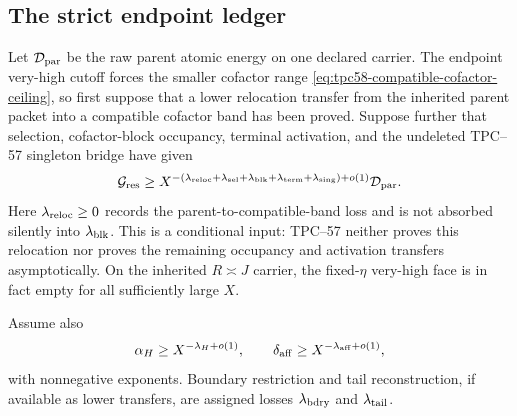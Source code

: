 \subsection{The strict endpoint ledger}

Let \(\mathcal D_{\rm par}\) be the raw parent atomic energy on one declared
carrier.  The endpoint very-high cutoff forces the smaller cofactor range
\eqref{eq:tpc58-compatible-cofactor-ceiling}, so first suppose that a lower
relocation transfer from the inherited parent packet into a compatible
cofactor band has been proved.  Suppose further that selection,
cofactor-block occupancy, terminal activation, and the undeleted TPC--57
singleton bridge have given
\begin{equation}
 \mathcal G_{\rm res}
 \ge
 X^{-(\lambda_{\rm reloc}+\lambda_{\rm sel}+\lambda_{\rm blk}
      +\lambda_{\rm term}+\lambda_{\rm sing})+o(1)}
 \mathcal D_{\rm par}.
 \label{eq:tpc58-upstream-residual-lower}
\end{equation}
Here \(\lambda_{\rm reloc}\ge0\) records the parent-to-compatible-band
loss and is not absorbed silently into \(\lambda_{\rm blk}\).  This is a
conditional input: TPC--57 neither proves this relocation nor proves the
remaining occupancy and activation transfers asymptotically.  On the
inherited \(R\asymp J\) carrier, the fixed-\(\eta\) very-high face is in
fact empty for all sufficiently large \(X\).

Assume also
\begin{equation}
 \alpha_H\ge X^{-\lambda_H+o(1)},
 \qquad
 \delta_{\rm aff}\ge X^{-\lambda_{\rm aff}+o(1)},
 \label{eq:tpc58-two-Gram-losses}
\end{equation}
with nonnegative exponents.  Boundary restriction and tail reconstruction,
if available as lower transfers, are assigned losses
\(\lambda_{\rm bdry}\) and \(\lambda_{\rm tail}\).


